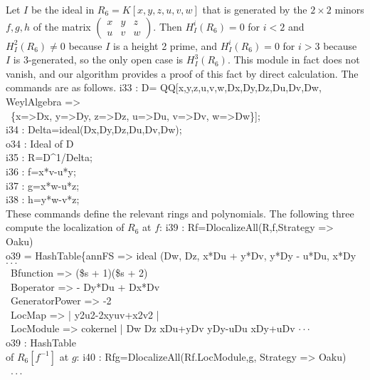 \begin{example}
Let $I$ be the ideal in $R_6=K[x,y,z,u,v,w]$ that is generated by the
$2\times 2$ minors $f,g,h$ of the matrix
$\left(\begin{array}{ccc}x&y&z\\u&v&w\end{array}\right)$.
Then $H_I^i(R_6)=0$ for $i<2$ and 
$H^2_I(R_6)\ne 0$ because $I$ is a height 2 prime,
 and $H^i_I(R_6)=0$ for $i>3$
because $I$ is  
3-generated, so the only open case is $H^3_I(R_6)$. This module
 in
fact does 
not vanish, and our algorithm provides a proof of this 
fact by direct calculation. The \Mtwo commands are as follows.
\beginOutput
i33 : D= QQ[x,y,z,u,v,w,Dx,Dy,Dz,Du,Dv,Dw, WeylAlgebra =>\\
\                \{x=>Dx, y=>Dy, z=>Dz, u=>Du, v=>Dv, w=>Dw\}];\\
\endOutput
\beginOutput
i34 : Delta=ideal(Dx,Dy,Dz,Du,Dv,Dw);\\
\emptyLine
o34 : Ideal of D\\
\endOutput
\beginOutput
i35 : R=D^1/Delta;\\
\endOutput
\beginOutput
i36 : f=x*v-u*y;\\
\endOutput
\beginOutput
i37 : g=x*w-u*z;\\
\endOutput
\beginOutput
i38 : h=y*w-v*z;\\
\endOutput
These commands define the relevant rings and polynomials. The
following three
compute the localization of $R_6$ at $f$: 
\beginOutput
i39 : Rf=DlocalizeAll(R,f,Strategy => Oaku)\\
\emptyLine
o39 = HashTable\{annFS => ideal (Dw, Dz, x*Du + y*Dv, y*Dy - u*Du, x*Dy $\cdot\cdot\cdot$\\
\                Bfunction => (\$s + 1)(\$s + 2)\\
\                Boperator => - Dy*Du + Dx*Dv\\
\                GeneratorPower => -2\\
\                LocMap => | y2u2-2xyuv+x2v2 |\\
\                LocModule => cokernel | Dw Dz xDu+yDv yDy-uDu xDy+uDv  $\cdot\cdot\cdot$\\
\emptyLine
o39 : HashTable\\
\endOutput
of $R_6[f^{-1}]$ at
$g$:
\beginOutput
i40 : Rfg=DlocalizeAll(Rf.LocModule,g, Strategy => Oaku)\\
\emptyLine
\                                                                       $\cdot\cdot\cdot$\\

\end{example}
